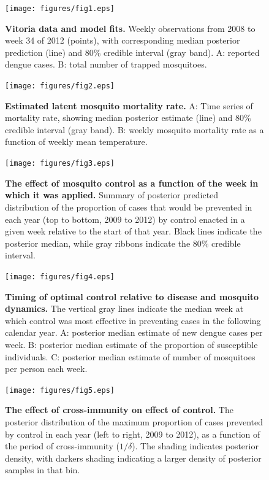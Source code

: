 \documentclass[10pt,letterpaper]{article}
\begin{document}
\begin{figure}[!h]
\texttt{[image: figures/fig1.eps]}
\caption{{\bf Vitoria data and model fits.}
Weekly observations from 2008 to week 34 of 2012 (points), with corresponding median posterior prediction (line) and 80\% credible interval (gray band). A: reported dengue cases. B: total number of trapped mosquitoes.
}
\label{timeseries}
\end{figure}

\begin{figure}[!h]
\texttt{[image: figures/fig2.eps]}
\caption{{\bf Estimated latent mosquito mortality rate.}
A: Time series of mortality rate, showing median posterior estimate (line) and 80\% credible interval (gray band). B: weekly mosquito mortality rate as a function of weekly mean temperature.
}
\label{mortality}
\end{figure}

\begin{figure}[!h]
\texttt{[image: figures/fig3.eps]}
\caption{{\bf The effect of mosquito control as a function of the week in which it was applied.}
Summary of posterior predicted distribution of the proportion of cases that would be prevented in each year (top to bottom, 2009 to 2012) by control enacted in a given week relative to the start of that year. Black lines indicate the posterior median, while gray ribbons indicate the $80\%$ credible interval.
}
\label{control}
\end{figure}

\begin{figure}[!h]
\texttt{[image: figures/fig4.eps]}
\caption{{\bf Timing of optimal control relative to disease and mosquito dynamics.}
The vertical gray lines indicate the median week at which control was most effective in preventing cases in the following calendar year. A: posterior median estimate of new dengue cases per week. B: posterior median estimate of the proportion of susceptible individuals. C: posterior median estimate of number of mosquitoes per person each week.
}
\label{timing}
\end{figure}

\begin{figure}[!h]
\texttt{[image: figures/fig5.eps]}
\caption{{\bf The effect of cross-immunity on effect of control.}
The posterior distribution of the maximum proportion of cases prevented by control in each year (left to right, 2009 to 2012), as a function of the period of cross-immunity ($1/\delta$). The shading indicates posterior density, with darkers shading indicating a larger density of posterior samples in that bin.
}
\label{immunity}
\end{figure}
\end{document}
